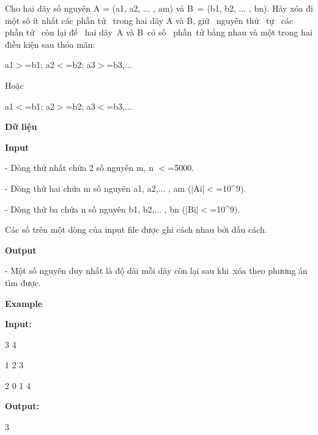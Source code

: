 

Cho hai dãy số nguyên A = (a1, a2, ... , am) và B = (b1, b2, ... , bn). Hãy xóa đi một số ít nhất các phần tử  trong hai dãy A và B, giữ  nguyên thứ  tự  các phần tử  còn lại để  hai dãy A và B có số  phần tử bằng nhau và một trong hai điều kiện sau thỏa mãn:

a1$>$=b1; a2$<$=b2; a3$>$=b3,...

Hoặc 

a1$<$=b1; a2$>$=b2; a3$<$=b3,...

\textbf{Dữ liệu}

\textbf{Input}

- Dòng thứ nhất chứa 2 số nguyên m, n $<$=5000.

- Dòng thứ hai chứa m số nguyên a1, a2,... , am (|Ai|$<$=10\textasciicircum9).

- Dòng thứ ba chứa n số nguyên b1, b2,... , bn (|Bi|$<$=10\textasciicircum9).

Các số trên một dòng của input file được ghi cách nhau bởi dấu cách.

\textbf{Output}

- Một số nguyên duy nhất là độ dài mỗi dãy còn lại sau khi xóa theo phương án tìm được.

\textbf{Example}

\textbf{Input:}

3 4

1 2 3

2 0 1 4

\textbf{Output:}

3
